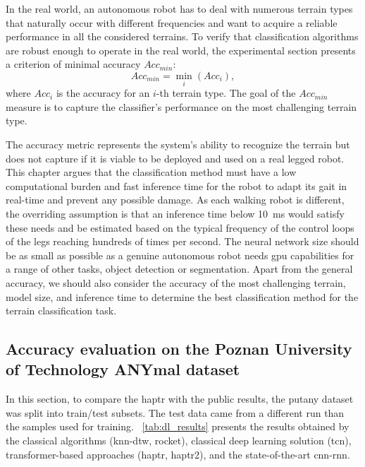 \documentclass[a4paper, 10pt, twoside]{report}
\begin{document}
In the real world, an autonomous robot has to deal with numerous terrain types that naturally occur with different frequencies and want to acquire a reliable performance in all the considered terrains. To verify that classification algorithms are robust enough to operate in the real world, the experimental section presents a criterion of minimal accuracy $\textit{Acc}_{min}$:
\begin{equation}
    \textit{Acc}_{min} = \min_i(\textit{Acc}_i),
\end{equation}
where $\textit{Acc}_i$ is the accuracy for an $i$-th terrain type. The goal of the $\textit{Acc}_{min}$ measure is to capture the classifier's performance on the most challenging terrain type.

The accuracy metric represents the system's ability to recognize the terrain but does not capture if it is viable to be deployed and used on a real legged robot. This chapter argues that the classification method must have a low computational burden and fast inference time for the robot to adapt its gait in real-time and prevent any possible damage. As each walking robot is different, the overriding assumption is that an inference time below 10~ms would satisfy these needs and be estimated based on the typical frequency of the control loops of the legs reaching hundreds of times per second. The neural network size should be as small as possible as a genuine autonomous robot needs \acrshort{gpu} capabilities for a range of other tasks, \eg object detection or segmentation. Apart from the general accuracy, we should also consider the accuracy of the most challenging terrain, model size, and inference time to determine the best classification method for the terrain classification task. 

\subsection{Accuracy evaluation on the Poznan University of Technology ANYmal dataset}
\label{part:experiments:terrain:accuracy}

In this section, to compare the \acrshort{haptr} with the public results, the \acrshort{putany} dataset was split into train/test subsets. The test data came from a different run than the samples used for training. \Table~\ref{tab:dl_results} presents the results obtained by the classical algorithms (\acrshort{knn}-\acrshort{dtw}, \acrshort{rocket}), classical deep learning solution (\acrshort{tcn}), transformer-based approaches (\acrshort{haptr}, \acrshort{haptr}2), and the state-of-the-art \acrshort{cnn}-\acrshort{rnn}.
\end{document}
